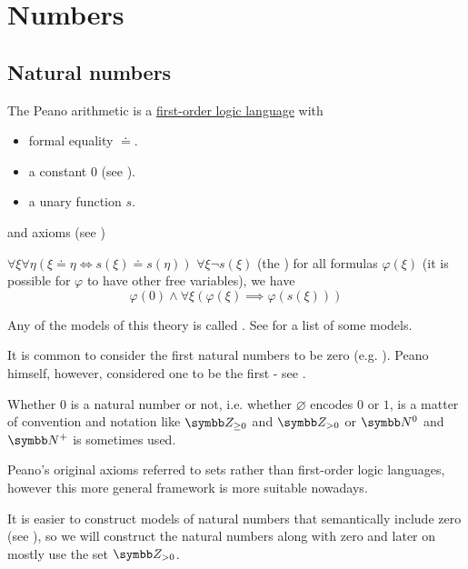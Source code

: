 \section{Numbers}\label{sec:numbers}
\subsection{Natural numbers}\label{subsec:natural_numbers}

\begin{definition}\label{def:peano_arithmetic}
  The Peano arithmetic is a \hyperref[def:first_order_logic_language]{first-order logic language} with
  \begin{itemize}
    \item formal equality \( \doteq \).
    \item a constant \( 0 \) (see ).
    \item a unary function \( s \).
  \end{itemize}
  and axioms (see )
  \begin{DefEnum}
     \( \forall \xi \forall \eta (\xi \doteq \eta \iff s(\xi) \doteq s(\eta)) \)
     \( \forall \xi \neg s(\xi) \)
     (the ) for all formulas \( \varphi(\xi) \) (it is possible for \( \varphi \) to have other free variables), we have
    \begin{equation*}
      \varphi(0) \wedge \forall \xi (\varphi(\xi) \implies \varphi(s(\xi)))
    \end{equation*}
  \end{DefEnum}

  Any of the models of this theory is called . See  for a list of some models.
\end{definition}

\begin{remark}\label{remark:peano_arithmetic_zero}
  It is common to consider the first natural numbers to be zero (e.g. \cite[67]{Enderton1977}). Peano himself, however, considered one to be the first - see \cite[1]{Peano1889}.

  Whether \( 0 \) is a natural number or not, i.e. whether \( \varnothing \) encodes \( 0 \) or \( 1 \), is a matter of convention and notation like \( \BZ_{\geq 0} \) and \( \BZ_{>0} \) or \( \BN^0 \) and \( \BN^+ \) is sometimes used.

  Peano's original axioms referred to sets rather than first-order logic languages, however this more general framework is more suitable nowadays.

  It is easier to construct models of natural numbers that semantically include zero (see ), so we will construct the natural numbers along with zero and later on mostly use the set \( \BZ_{>0} \).
\end{remark}

